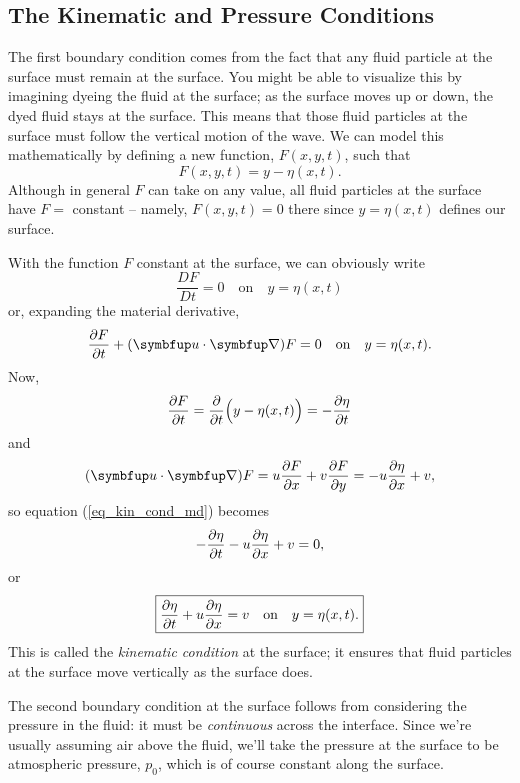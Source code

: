 
\subsection{The Kinematic and Pressure Conditions}
\label{sec_kin_press_cond}

The first boundary condition comes from the fact that any fluid particle at the surface must remain at the surface.  You might be able to visualize this by imagining dyeing the fluid at the surface; as the surface moves up or down, the dyed fluid stays at the surface.  This means that those fluid particles at the surface must follow the vertical motion of the wave.  We can model this mathematically by defining a new function, $F(x, y, t)$, such that
\begin{equation}
F(x, y, t) = y - \eta(x, t).
\end{equation}
Although in general $F$ can take on any value, all fluid particles at the surface have $F =$ constant -- namely, $F(x, y, t) = 0$ there since $y = \eta(x, t)$ defines our surface.

With the function $F$ constant at the surface, we can obviously write
\[
\frac{DF}{Dt} = 0 \quad \text{on} \quad y = \eta(x, t)
\]
or, expanding the material derivative,
\begin{equation}
\label{eq_kin_cond_md}
\dfdx{F}{t} + (\vec{u} \cdot \grad ) F = 0 \quad \text{on} \quad y = \eta(x, t).
\end{equation}
Now,
\[
\frac{\partial {F}}{\partial {t}} = \frac{\partial}{\partial t} \Bigl( y - \eta(x, t) \Bigr) = -\frac{\partial {\eta}}{\partial {t}}
\]
and
\[
(\vec{u} \cdot \grad) F = u \dfdx{F}{x} + v\dfdx{F}{y} = -u \dfdx{\eta}{x} + v,
\]
so equation (\ref{eq_kin_cond_md}) becomes
\[
-\frac{\partial {\eta}}{\partial {t}} - u\frac{\partial {\eta}}{\partial {x}} + v = 0,
\]
or
\begin{equation}
\label{eq_kin_cond}
\boxed{
\frac{\partial {\eta}}{\partial {t}} + u\frac{\partial {\eta}}{\partial {x}} = v \quad \text{on} \quad y = \eta(x, t).
}
\end{equation}
This is called the \emph{kinematic condition} at the surface; it ensures that fluid particles at the surface move vertically as the surface does.

The second boundary condition at the surface follows from considering the pressure in the fluid:  it must be \emph{continuous} across the interface.  Since we're usually assuming air above the fluid, we'll take the pressure at the surface to be atmospheric pressure, $p_0$, which is of course constant along the surface.  

